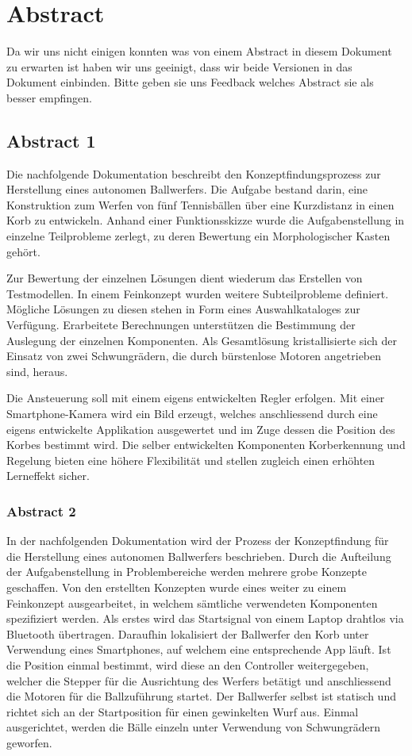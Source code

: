 \section*{Abstract}

Da wir uns nicht einigen konnten was von einem Abstract in diesem Dokument zu erwarten ist haben wir uns geeinigt, dass wir beide Versionen in das Dokument einbinden.
Bitte geben sie uns Feedback welches Abstract sie als besser empfingen.

\subsection{Abstract 1}
Die nachfolgende Dokumentation beschreibt den Konzeptfindungsprozess zur Herstellung eines autonomen Ballwerfers. Die Aufgabe bestand darin, eine Konstruktion zum Werfen von fünf Tennisbällen über eine Kurzdistanz in einen Korb zu entwickeln. Anhand einer Funktionsskizze wurde die Aufgabenstellung in einzelne Teilprobleme zerlegt, zu deren Bewertung ein Morphologischer Kasten gehört.

Zur Bewertung der einzelnen Lösungen dient wiederum das Erstellen von Testmodellen. In einem Feinkonzept wurden weitere Subteilprobleme definiert. Mögliche Lösungen zu diesen stehen in Form eines Auswahlkataloges zur Verfügung. Erarbeitete Berechnungen unterstützen die Bestimmung der Auslegung der einzelnen Komponenten. Als Gesamtlösung kristallisierte sich der Einsatz von zwei Schwungrädern, die durch bürstenlose Motoren angetrieben sind, heraus.

Die Ansteuerung soll mit einem eigens entwickelten Regler erfolgen. Mit einer Smartphone-Kamera wird ein Bild erzeugt, welches anschliessend durch eine eigens entwickelte Applikation ausgewertet und im Zuge dessen die Position des Korbes bestimmt wird. Die selber entwickelten Komponenten Korberkennung und Regelung bieten eine höhere Flexibilität und stellen zugleich einen erhöhten Lerneffekt sicher.

\subsubsection{Abstract 2}
In der nachfolgenden Dokumentation wird der Prozess der Konzeptfindung für die Herstellung eines autonomen Ballwerfers beschrieben. Durch die Aufteilung der Aufgabenstellung in Problembereiche werden mehrere grobe Konzepte geschaffen. Von den erstellten Konzepten wurde eines weiter zu einem Feinkonzept ausgearbeitet, in welchem sämtliche verwendeten Komponenten spezifiziert werden. Als erstes wird das Startsignal von einem Laptop drahtlos via Bluetooth übertragen. Daraufhin lokalisiert der Ballwerfer den Korb unter Verwendung eines Smartphones, auf welchem eine entsprechende App läuft. Ist die Position einmal bestimmt, wird diese an den Controller weitergegeben, welcher die Stepper für die Ausrichtung des Werfers betätigt und anschliessend die Motoren für die Ballzuführung startet. Der Ballwerfer selbst ist statisch und richtet sich an der Startposition für einen gewinkelten Wurf aus. Einmal ausgerichtet, werden die Bälle einzeln unter Verwendung von Schwungrädern geworfen.